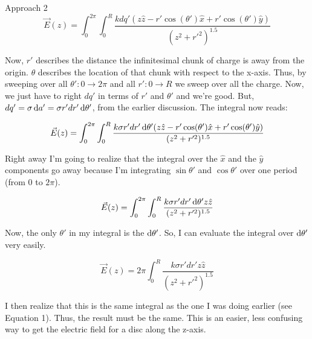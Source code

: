\begin{homeworkProblem}
\begin{homeworkSection}{Approach 2}
        \[ \vec{E}(z) = \int_0^{2\pi} \int_0^R \frac{k dq' (z \hat{z}-
        r'\cos(\theta')\hat{x}+r'\cos(\theta')\hat{y})}{(z^2+r'^2)^{1.5}}
        \]

        Now, $r'$ describes the distance the infinitesimal chunk of
        charge is away from the origin. $\theta$ describes the location
        of that chunk with respect to the x-axis. Thus, by sweeping over
        all $\theta': 0 \rightarrow 2\pi$ and all $r': 0 \rightarrow R$ we
        sweep over all the charge. Now, we just have to right $dq'$ in
        terms of $r'$ and $\theta'$ and we're good. But, $dq' = \sigma
        \mathop{}\!\mathrm{d} a' = \sigma r' dr' \mathop{}\!\mathrm{d} \theta'$, from the earlier
        discussion. The integral now reads:

        \[ \vec{E}(z) = \int_0^{2\pi} \int_0^R \frac{k \sigma r' dr'
        \mathop{}\!\mathrm{d} \theta' (z \hat{z}-
        r'\cos(\theta')\hat{x}+r'\cos(\theta')\hat{y})}{(z^2+r'^2)^{1.5}}
        \]

       Right away I'm going to realize that the integral over the
       $\hat{x}$ and the $\hat{y}$ components go away because I'm
       integrating $\sin\theta'$ and $\cos\theta'$ over one period (from
       0 to $2\pi$).

        \[ \vec{E}(z) = \int_0^{2\pi} \int_0^R \frac{k \sigma r' dr'
        \mathop{}\!\mathrm{d} \theta' z \hat{z} }{(z^2+r'^2)^{1.5}}
        \]

        Now, the only $\theta'$ in my integral is the $\mathop{}\!\mathrm{d} \theta'$.
        So, I can evaluate the integral over $\mathop{}\!\mathrm{d} \theta'$ very
        easily. 

        \[ \vec{E}(z) = 2\pi \int_0^R \frac{k \sigma r' dr'
        z \hat{z} }{(z^2+r'^2)^{1.5}}
        \]

        I then realize that this is the same integral as the one I was
        doing earlier (see Equation 1). Thus, the result must be the
        same. This is an easier, less confusing way to get the electric
        field for a disc along the z-axis.

    \end{homeworkSection}    
\end{homeworkProblem}
